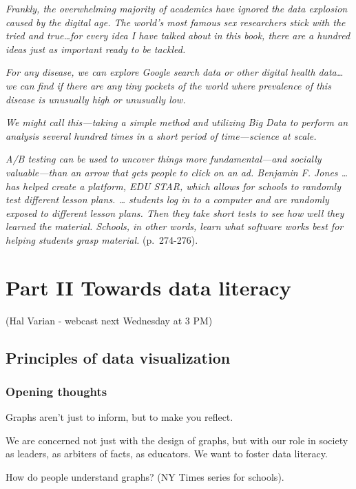 \documentclass[]{book}
\theoremstyle{definition}
\theoremstyle{definition}
\theoremstyle{definition}
\theoremstyle{remark}
\begin{document}
\emph{Frankly, the overwhelming majority of academics have ignored the
data explosion caused by the digital age. The world's most famous sex
researchers stick with the tried and true\ldots{}for every idea I have
talked about in this book, there are a hundred ideas just as important
ready to be tackled.}

\emph{For any disease, we can explore Google search data or other
digital health data\ldots{}we can find if there are any tiny pockets of
the world where prevalence of this disease is unusually high or
unusually low.}

\emph{We might call this---taking a simple method and utilizing Big Data
to perform an analysis several hundred times in a short period of
time---science at scale.}

\emph{A/B testing can be used to uncover things more fundamental---and
socially valuable---than an arrow that gets people to click on an ad.
Benjamin F. Jones \ldots{} has helped create a platform, EDU STAR, which
allows for schools to randomly test different lesson plans. \ldots{}
students log in to a computer and are randomly exposed to different
lesson plans. Then they take short tests to see how well they learned
the material. Schools, in other words, learn what software works best
for helping students grasp material.} (p.~274-276).

\part{Part II Towards data
literacy}\label{part-part-ii-towards-data-literacy}

(Hal Varian - webcast next Wednesday at 3 PM)

\chapter{Principles of data
visualization}\label{principles-of-data-visualization}

\section{Opening thoughts}\label{opening-thoughts}

Graphs aren't just to inform, but to make you reflect.

We are concerned not just with the design of graphs, but with our role
in society as leaders, as arbiters of facts, as educators. We want to
foster data literacy.

How do people understand graphs? (NY Times series for schools).
\end{document}
